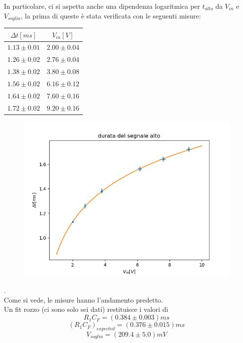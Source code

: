 \documentclass[10pt,a4paper]{article}
\begin{document}
In particolare, ci si aspetta anche una dipendenza logaritmica per $t_{alto}$ da $V_{in}$ e $V_{soglia}$, la prima di queste è stata verificata con le seguenti misure:
\begin{center}
\begin{tabular}{|c|c|}
	
	\hline 
	$\Delta t [ms]$ & $V_{in}[V]$ \\ 
	
	\hline 
	$1.13\pm0.01$ & $2.00\pm0.04$ \\ 
\hline 
	$1.26\pm 0.02$ & $2.76\pm0.04$ \\ 
\hline 
	$1.38\pm0.02$ & $3.80\pm0.08$ \\ 
	\hline 
	$1.56\pm0.02$ & $6.16\pm0.12$ \\ 
	\hline 
	$1.64\pm0.02$ & $7.60\pm0.16$ \\ 
	
	\hline 
	$1.72\pm0.02$ & $9.20\pm0.16$ \\ 
	\hline 

\end{tabular} 
\end{center}

\begin{figure}[h] \centering
	\includegraphics[scale=0.7]{Figure_1.png}
\end{figure}.\\
Come si vede, le misure hanno l'andamento predetto. \\Un fit rozzo (ci sono solo sei dati) restituisce i valori di \[R_1 C_F=(0.384\pm0.003) ms \] \[(R_1 C_F)_{expected}=(0.376\pm0.015) ms\] 
\[V_{soglia}=(209.4\pm5.0) mV\]
\end{document}
